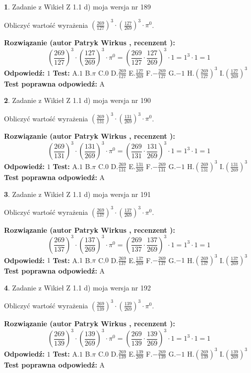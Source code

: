 \documentclass[12pt, a4paper]{article}
\theoremstyle{definition} %
\newtheorem{zad}{}
\newcommand{\zadStart}[1]{\begin{zad}#1\newline}
\newcommand{\zadStop}{\end{zad}}
\newcommand{\rozwStart}[2]{\noindent \textbf{Rozwiązanie (autor #1 , recenzent #2): }\newline}
\newcommand{\rozwStop}{\newline}
\newcommand{\odpStart}{\noindent \textbf{Odpowiedź:}\newline}
\newcommand{\odpStop}{\newline}
\newcommand{\testStart}{\noindent \textbf{Test:}\newline}
\newcommand{\testStop}{\newline}
\newcommand{\kluczStart}{\noindent \textbf{Test poprawna odpowiedź:}\newline}
\newcommand{\kluczStop}{\newline}
\begin{document}
\zadStart{Zadanie z Wikieł Z 1.1 d) moja wersja nr 189}

Obliczyć wartość wyrażenia $(\frac{269}{127})^{3} \cdot (\frac{127}{269})^{3} \cdot \pi^{0}$.
\zadStop
\rozwStart{Patryk Wirkus}{}
$$(\frac{269}{127})^{3} \cdot (\frac{127}{269})^{3} \cdot \pi^{0} = (\frac{269}{127} \cdot \frac{127}{269})^{3} \cdot 1 = 1^{3} \cdot 1 = 1$$
\rozwStop
\odpStart
$1$
\odpStop
\testStart
A.$1$ B.$\pi$ C.$0$ D.$\frac{269}{127}$ E.$\frac{127}{269}$
F.$-\frac{269}{127}$ G.$-1$
H.$(\frac{269}{127})^{3}$
I.$(\frac{127}{269})^{3}$
\testStop
\kluczStart
A
\kluczStop



\zadStart{Zadanie z Wikieł Z 1.1 d) moja wersja nr 190}

Obliczyć wartość wyrażenia $(\frac{269}{131})^{3} \cdot (\frac{131}{269})^{3} \cdot \pi^{0}$.
\zadStop
\rozwStart{Patryk Wirkus}{}
$$(\frac{269}{131})^{3} \cdot (\frac{131}{269})^{3} \cdot \pi^{0} = (\frac{269}{131} \cdot \frac{131}{269})^{3} \cdot 1 = 1^{3} \cdot 1 = 1$$
\rozwStop
\odpStart
$1$
\odpStop
\testStart
A.$1$ B.$\pi$ C.$0$ D.$\frac{269}{131}$ E.$\frac{131}{269}$
F.$-\frac{269}{131}$ G.$-1$
H.$(\frac{269}{131})^{3}$
I.$(\frac{131}{269})^{3}$
\testStop
\kluczStart
A
\kluczStop



\zadStart{Zadanie z Wikieł Z 1.1 d) moja wersja nr 191}

Obliczyć wartość wyrażenia $(\frac{269}{137})^{3} \cdot (\frac{137}{269})^{3} \cdot \pi^{0}$.
\zadStop
\rozwStart{Patryk Wirkus}{}
$$(\frac{269}{137})^{3} \cdot (\frac{137}{269})^{3} \cdot \pi^{0} = (\frac{269}{137} \cdot \frac{137}{269})^{3} \cdot 1 = 1^{3} \cdot 1 = 1$$
\rozwStop
\odpStart
$1$
\odpStop
\testStart
A.$1$ B.$\pi$ C.$0$ D.$\frac{269}{137}$ E.$\frac{137}{269}$
F.$-\frac{269}{137}$ G.$-1$
H.$(\frac{269}{137})^{3}$
I.$(\frac{137}{269})^{3}$
\testStop
\kluczStart
A
\kluczStop



\zadStart{Zadanie z Wikieł Z 1.1 d) moja wersja nr 192}

Obliczyć wartość wyrażenia $(\frac{269}{139})^{3} \cdot (\frac{139}{269})^{3} \cdot \pi^{0}$.
\zadStop
\rozwStart{Patryk Wirkus}{}
$$(\frac{269}{139})^{3} \cdot (\frac{139}{269})^{3} \cdot \pi^{0} = (\frac{269}{139} \cdot \frac{139}{269})^{3} \cdot 1 = 1^{3} \cdot 1 = 1$$
\rozwStop
\odpStart
$1$
\odpStop
\testStart
A.$1$ B.$\pi$ C.$0$ D.$\frac{269}{139}$ E.$\frac{139}{269}$
F.$-\frac{269}{139}$ G.$-1$
H.$(\frac{269}{139})^{3}$
I.$(\frac{139}{269})^{3}$
\testStop
\kluczStart
A
\kluczStop
\end{document}
